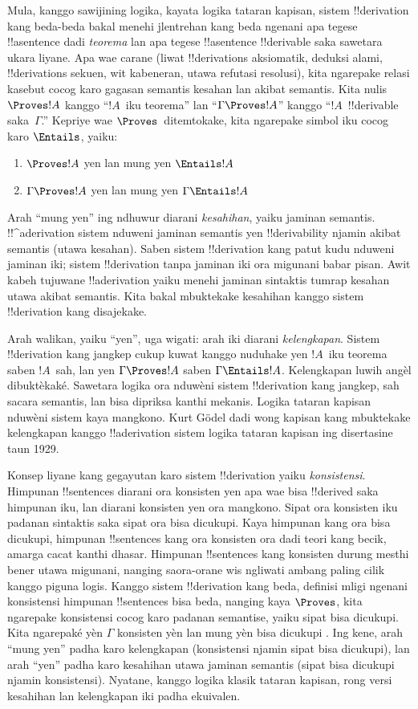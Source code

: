 \documentclass[../../../include/open-logic-section]{subfiles}
\begin{document}
Mula, kanggo sawijining logika, kayata logika tataran kapisan, sistem
!!{derivation} kang beda-beda bakal menehi jlentrehan kang beda ngenani
apa tegese !!a{sentence} dadi \emph{teorema} lan apa tegese
!!a{sentence} !!{derivable} saka sawetara ukara liyane. Apa wae
carane (liwat !!{derivation}s aksiomatik, deduksi alami,
!!{derivation}s sekuen, wit kabeneran, utawa refutasi resolusi), kita
ngarepake relasi kasebut cocog karo gagasan semantis kesahan lan
akibat semantis. Kita nulis $\Proves !A$ kanggo ``$!A$~iku teorema''
lan ``$\Gamma \Proves !A$'' kanggo ``$!A$~!!{derivable}
saka~$\Gamma$.'' Kepriye wae $\Proves$~ditemtokake, kita ngarepake
simbol iku cocog karo $\Entails$, yaiku:
\begin{enumerate}
\item $\Proves !A$ yen lan mung yen $\Entails !A$
\item $\Gamma \Proves !A$ yen lan mung yen $\Gamma \Entails !A$
\end{enumerate}
Arah ``mung yen'' ing ndhuwur diarani \emph{kesahihan}, yaiku jaminan
semantis. !!^a{derivation} sistem nduweni jaminan semantis yen
!!{derivability} njamin akibat semantis (utawa kesahan). Saben sistem
!!{derivation} kang patut kudu nduweni jaminan iki; sistem
!!{derivation} tanpa jaminan iki ora migunani babar pisan.
Awit kabeh tujuwane !!a{derivation} yaiku menehi jaminan sintaktis
tumrap kesahan utawa akibat semantis. Kita bakal mbuktekake kesahihan
kanggo sistem !!{derivation} kang disajekake.

Arah walikan, yaiku ``yen'', uga wigati: arah iki diarani
\emph{kelengkapan}. Sistem !!{derivation} kang jangkep cukup kuwat
kanggo nuduhake yen $!A$~iku teorema saben $!A$~sah, lan yen
$\Gamma \Proves !A$ saben $\Gamma \Entails !A$. Kelengkapan luwih angèl dibuktèkaké. Sawetara logika ora nduwèni sistem !!{derivation}
kang jangkep, sah sacara semantis, lan bisa dipriksa kanthi mekanis.
Logika tataran kapisan nduwèni sistem kaya mangkono.
Kurt G\"odel dadi wong kapisan
kang mbuktekake kelengkapan kanggo !!a{derivation} sistem logika
tataran kapisan ing disertasine taun 1929.

Konsep liyane kang gegayutan karo sistem !!{derivation} yaiku
\emph{konsistensi}. Himpunan !!{sentence}s diarani ora konsisten yen
apa wae bisa !!{derive}d saka himpunan iku, lan diarani konsisten yen
ora mangkono. Sipat ora konsisten iku padanan sintaktis saka sipat
ora bisa dicukupi. Kaya himpunan kang ora bisa dicukupi,
himpunan !!{sentence}s
kang ora konsisten ora dadi teori kang becik, amarga cacat kanthi
dhasar. Himpunan !!{sentence}s kang konsisten durung mesthi bener utawa
migunani, nanging saora-orane wis ngliwati ambang paling cilik kanggo
piguna logis. Kanggo sistem !!{derivation} kang beda, definisi mligi
ngenani konsistensi himpunan !!{sentence}s bisa beda, nanging kaya
$\Proves$, kita ngarepake konsistensi cocog karo padanan semantise,
yaiku sipat bisa dicukupi. Kita ngarepaké yèn $\Gamma$ konsisten
yèn lan mung yèn bisa dicukupi .
Ing kene, arah ``mung yen'' padha karo kelengkapan (konsistensi njamin
sipat bisa dicukupi), lan arah ``yen'' padha karo kesahihan utawa
jaminan semantis (sipat bisa dicukupi njamin konsistensi). Nyatane,
kanggo logika klasik tataran kapisan, rong versi kesahihan lan
kelengkapan iki padha ekuivalen.
\end{document}
